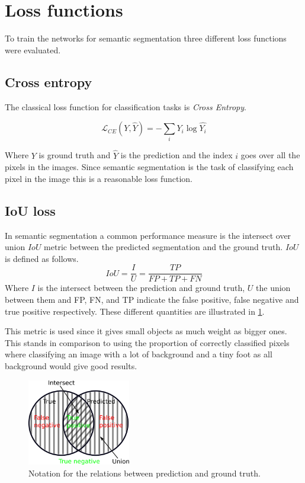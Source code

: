 \documentclass{kththesis}
\begin{document}
\section{Loss functions}
To train the networks for semantic segmentation three different loss functions
were evaluated.

\subsection{Cross entropy}\label{section:cross_entropy}
The classical loss function for classification tasks is
\textit{Cross Entropy}.

\[\mathcal{L}_{CE}(Y, \hat{Y}) =- \sum_i Y_i \log\hat{Y_i}\]

Where \(Y\) is ground truth and \(\hat{Y}\) is the prediction and the index
\(i\) goes over all the pixels in the images. Since
semantic segmentation is the task of classifying each pixel in the image this is
a reasonable loss function.

\subsection{IoU loss} \label{sec:IoU_loss}
In semantic segmentation a common performance measure is the intersect over union
\(IoU\) metric between the predicted segmentation and the ground truth.
\(IoU\) is defined as follows.
\[IoU = \frac{I}{U} = \frac{\textit{TP}}{\textit{FP} + \textit{TP} + \textit{FN}}\]
Where \(I\) is the intersect between the prediction and ground truth, \(U\) the union
between them and FP, FN, and TP indicate the false positive, false negative and
true positive respectively. These different quantities are illustrated in \cref{fig:IoU}.

This metric is used since it gives small objects as much weight as bigger ones.
This stands in comparison to using the proportion of correctly classified pixels
where classifying an image with a lot of background and a tiny foot as all background
would give good results.

\begin{figure}[h]
  \centering
  \includegraphics[width=0.40\textwidth]{IoU}
  \caption{Notation for the relations between prediction and ground truth.}
  \label{fig:IoU}
\end{figure}
\end{document}
